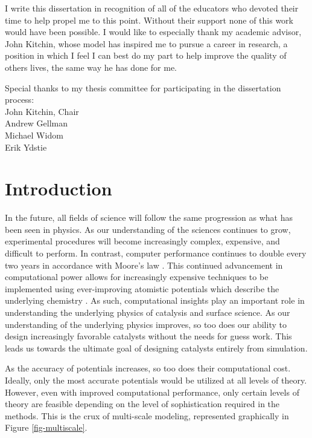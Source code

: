 \documentclass[12pt,oneside]{cmuthesis}
\begin{document}
\begin{acknowledgments}
I write this dissertation in recognition of all of the educators who devoted their time to help propel me to this point. Without their support none of this work would have been possible. I would like to especially thank my academic advisor, John Kitchin, whose model has inspired me to pursue a career in research, a position in which I feel I can best do my part to help improve the quality of others lives, the same way he has done for me.

Special thanks to my thesis committee for participating in the dissertation process: \\
John Kitchin, Chair \\
Andrew Gellman \\
Michael Widom \\
Erik Ydstie
\end{acknowledgments}

\tableofcontents
\listoftables
\listoffigures

\mainmatter
\renewcommand{\baselinestretch}{1.66}\normalsize

\chapter{Introduction}
\label{sec:ch0}
In the future, all fields of science will follow the same progression as what has been seen in physics. As our understanding of the sciences continues to grow, experimental procedures will become increasingly complex, expensive, and difficult to perform. In contrast, computer performance continues to double every two years in accordance with Moore's law \cite{schaller-1997-moores-law}. This continued advancement in computational power allows for increasingly expensive techniques to be implemented using ever-improving atomistic potentials which describe the underlying chemistry \cite{boes-2016-neural-networ,perdew-2005-presc-desig}. As such, computational insights play an important role in understanding the underlying physics of catalysis and surface science. As our understanding of the underlying physics improves, so too does our ability to design increasingly favorable catalysts without the needs for guess work. This leads us towards the ultimate goal of designing catalysts entirely from simulation.

As the accuracy of potentials increases, so too does their computational cost. Ideally, only the most accurate potentials would be utilized at all levels of theory. However, even with improved computational performance, only certain levels of theory are feasible depending on the level of sophistication required in the methods. This is the crux of multi-scale modeling, represented graphically in Figure \ref{fig-multiscale}.
\end{document}

